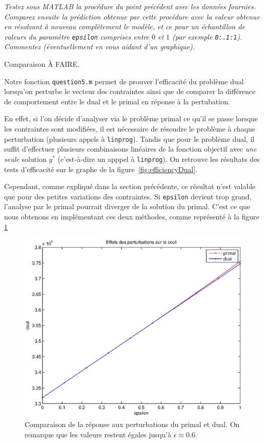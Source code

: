 \question %
\emph{Testez sous MATLAB la procédure du point précédent avec les données
fournies. Comparez ensuite la prédiction obtenue par cette procédure
avec la valeur obtenue en résolvant à nouveau complètement le modèle,
et ce pour un échantillon de valeurs du paramètre \texttt{epsilon} comprises
entre $0$ et $1$ (par exemple \texttt{0:.1:1}).
Commentez (éventuellement en vous aidant d'un graphique).}

Comparaison À FAIRE.

Notre fonction \texttt{question5.m} permet de prouver l'efficacité
du problème dual lorsqu'on perturbe le vecteur des contraintes
ainsi que de comparer la différence de comportement entre le dual
et le primal en réponse à la pertubation.

En effet, si l'on décide d'analyser via le problème primal ce qu'il
se passe lorsque les contraintes sont modifiées, il est nécessaire de
résoudre le problème à chaque perturbation
(plusieurs appels à \texttt{linprog}).
Tandis que pour le problème dual,
il suffit d'effectuer plusieurs combinaisons linéaires de la fonction objectif
avec \emph{une seule} solution $y^{*}$
(c'est-à-dire un apppel à \texttt{linprog}).
On retrouve les résultats des tests d'efficacité
sur le graphe de la figure~\ref{fig:efficiencyDual}.

Cependant, comme expliqué dans la section précédente, ce résultat n'est valable que pour des petites variations des contraintes.
Si \texttt{epsilon} devient trop grand, l'analyse par le primal pourrait diverger de la solution du primal.
C'est ce que nous obtenons en implémentant ces deux méthodes, comme représenté à la figure \ref{fig:responseToPerturbations}

\begin{figure}
  \begin{center}
    \includegraphics[scale=0.6]{img/responseToPerturbations.eps}
    \caption{Comparaison de la réponse aux perturbations du primal
    et dual. On remarque que les valeurs restent égales jusqu'à
    $\epsilon \approx 0.6$.}
    \label{fig:responseToPerturbations}
  \end{center}
\end{figure}

